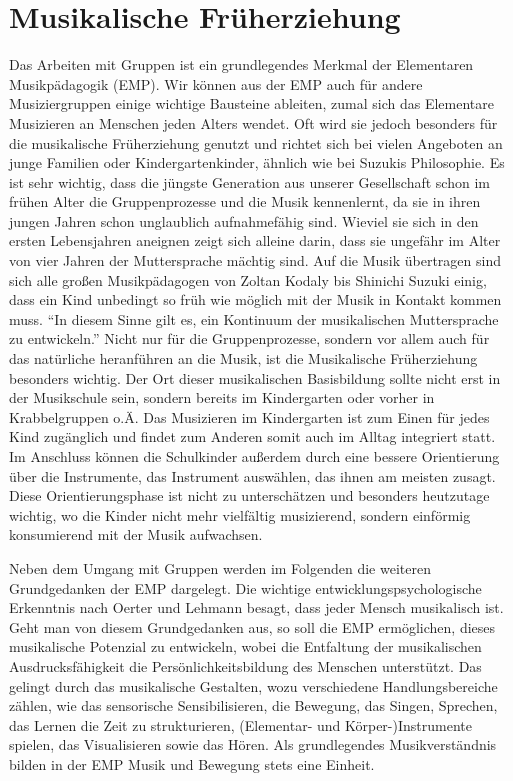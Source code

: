 \section{Musikalische Früherziehung}

Das Arbeiten mit Gruppen ist ein grundlegendes Merkmal der Elementaren
Musikpädagogik (EMP). Wir können aus der EMP auch für andere Musiziergruppen
einige wichtige Bausteine ableiten, zumal sich das Elementare Musizieren an
Menschen jeden Alters wendet.
\autocite[226]{busch:grundwissen_instrumentalpaedagogik} Oft wird sie jedoch
besonders für die musikalische Früherziehung genutzt und richtet sich bei vielen
Angeboten an junge Familien oder Kindergartenkinder, ähnlich wie bei Suzukis
Philosophie. Es ist sehr wichtig, dass die jüngste Generation aus unserer
Gesellschaft schon im frühen Alter die Gruppenprozesse und die Musik
kennenlernt, da sie in ihren jungen Jahren schon unglaublich aufnahmefähig sind.
Wieviel sie sich in den ersten Lebensjahren aneignen zeigt sich alleine darin,
dass sie ungefähr im Alter von vier Jahren der Muttersprache mächtig sind. Auf
die Musik übertragen sind sich alle großen Musikpädagogen von Zoltan Kodaly bis
Shinichi Suzuki einig, dass ein Kind unbedingt so früh wie möglich mit der Musik
in Kontakt kommen muss. \enquote{In diesem Sinne gilt es, ein Kontinuum der
musikalischen Muttersprache zu entwickeln.}
\autocite[45]{ernst:die_zukunftsfaehige_musikschule} Nicht nur für die
Gruppenprozesse, sondern vor allem auch für das natürliche heranführen an die
Musik, ist die Musikalische Früherziehung besonders wichtig. Der Ort dieser
musikalischen Basisbildung sollte nicht erst in der Musikschule sein, sondern
bereits im Kindergarten oder vorher in Krabbelgruppen o.Ä.
\autocite[43]{ernst:die_zukunftsfaehige_musikschule}
Das Musizieren im Kindergarten ist zum Einen für jedes Kind zugänglich und
findet zum Anderen somit auch im Alltag integriert statt. Im Anschluss können
die Schulkinder außerdem durch eine bessere Orientierung über die Instrumente,
das Instrument auswählen, das ihnen am meisten zusagt. Diese Orientierungsphase
ist nicht zu unterschätzen und besonders heutzutage wichtig, wo die Kinder nicht
mehr vielfältig musizierend, sondern einförmig konsumierend mit der Musik
aufwachsen.\autocite[37]{ernst:die_zukunftsfaehige_musikschule}

Neben dem Umgang mit Gruppen werden im Folgenden die weiteren Grundgedanken der
EMP dargelegt. Die wichtige entwicklungspsychologische Erkenntnis nach Oerter
und Lehmann besagt, dass jeder Mensch musikalisch
ist.\autocite[88]{musikalische_begabung} Geht man von diesem Grundgedanken aus,
so soll die EMP ermöglichen, dieses musikalische Potenzial zu entwickeln, wobei
die Entfaltung der musikalischen Ausdrucksfähigkeit die Persönlichkeitsbildung
des Menschen unterstützt. Das gelingt durch das musikalische Gestalten, wozu
verschiedene Handlungsbereiche zählen, wie das sensorische Sensibilisieren, die
Bewegung, das Singen, Sprechen, das Lernen die Zeit zu strukturieren,
(Elementar-  und Körper-)Instrumente spielen, das Visualisieren sowie das Hören.
\autocite[227]{busch:grundwissen_instrumentalpaedagogik} Als grundlegendes
Musikverständnis bilden in der EMP Musik und Bewegung stets eine Einheit.

